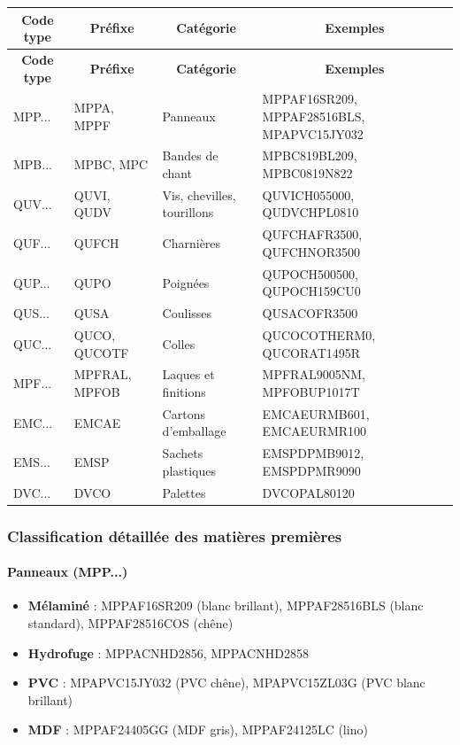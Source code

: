 \documentclass[12pt,a4paper]{article}
\begin{document}
\begin{longtable}{|p{2.5cm}|p{3cm}|p{5cm}|p{5cm}|}
\hline
\multicolumn{1}{|c|}{\textbf{Code type}} & \multicolumn{1}{c|}{\textbf{Préfixe}} & \multicolumn{1}{c|}{\textbf{Catégorie}} & \multicolumn{1}{c|}{\textbf{Exemples}} \\
\hline
\endfirsthead
\hline
\multicolumn{1}{|c|}{\textbf{Code type}} & \multicolumn{1}{c|}{\textbf{Préfixe}} & \multicolumn{1}{c|}{\textbf{Catégorie}} & \multicolumn{1}{c|}{\textbf{Exemples}} \\
\hline
\endhead
\hline
\endfoot
MPP... & MPPA, MPPF & Panneaux & MPPAF16SR209, MPPAF28516BLS, MPAPVC15JY032 \\
MPB... & MPBC, MPC & Bandes de chant & MPBC819BL209, MPBC0819N822 \\
QUV... & QUVI, QUDV & Vis, chevilles, tourillons & QUVICH055000, QUDVCHPL0810 \\
QUF... & QUFCH & Charnières & QUFCHAFR3500, QUFCHNOR3500 \\
QUP... & QUPO & Poignées & QUPOCH500500, QUPOCH159CU0 \\
QUS... & QUSA & Coulisses & QUSACOFR3500 \\
QUC... & QUCO, QUCOTF & Colles & QUCOCOTHERM0, QUCORAT1495R \\
MPF... & MPFRAL, MPFOB & Laques et finitions & MPFRAL9005NM, MPFOBUP1017T \\
EMC... & EMCAE & Cartons d'emballage & EMCAEURMB601, EMCAEURMR100 \\
EMS... & EMSP & Sachets plastiques & EMSPDPMB9012, EMSPDPMR9090 \\
DVC... & DVCO & Palettes & DVCOPAL80120 \\
\hline
\end{longtable}

\subsubsection{Classification détaillée des matières premières}

\paragraph{Panneaux (MPP...)}
\begin{itemize}
    \item \textbf{Mélaminé} : MPPAF16SR209 (blanc brillant), MPPAF28516BLS (blanc standard), MPPAF28516COS (chêne)
    \item \textbf{Hydrofuge} : MPPACNHD2856, MPPACNHD2858
    \item \textbf{PVC} : MPAPVC15JY032 (PVC chêne), MPAPVC15ZL03G (PVC blanc brillant)
    \item \textbf{MDF} : MPPAF24405GG (MDF gris), MPPAF24125LC (lino)
\end{itemize}
\end{document}
